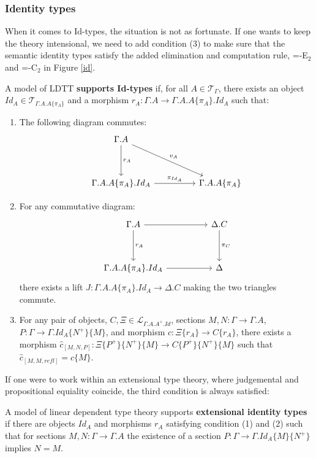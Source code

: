 \subsubsection{Identity types}
When it comes to Id-types, the situation is not as fortunate. If one wants to keep the theory intensional, we need to add condition (3) to make sure that the semantic identity types satisfy the added elimination and computation rule, =-E$_2$ and =-C$_2$ in Figure \ref{id}.

\begin{defn}[Id-types]\label{idsemantic}
  A model of LDTT \textbf{supports Id-types} if, for all $A \in \mathcal{T}_{\Gamma}$, there exists an object $Id_A \in \mathcal{T}_{\Gamma.A.A\{\pi_A\}}$ and a morphism $r_A : \Gamma.A \to \Gamma.A.A\{\pi_A\}.Id_{A}$ such that:
  \begin{enumerate}
    \item The following diagram commutes:
  \[
    \ti
    \Gamma.A \ar[d, "r_A"] \ar[rd, "v_A"]\\
    \Gamma.A.A\{\pi_A\}.Id_A \ar[r, "\pi_{Id_A}"] & \Gamma.A.A\{\pi_A\}
    \kz
  \]
\item For any commutative diagram:
  \[
    \ti
    \Gamma.A \ar[d, "r_A"] \ar[r] & \Delta.C \ar[d, "\pi_C"]\\
    \Gamma.A.A\{\pi_A\}.Id_A \ar[r] & \Delta
    \kz
  \]
  there exists a lift $J: \Gamma.A.A\{\pi_A\}.Id_A \to \Delta.C$ making the two triangles commute.
\item For any pair of objects, $C, \Xi \in \mathcal{L}_{\Gamma.A.A^+.Id}$, sections $M, N : \Gamma \to \Gamma.A$, $P : \Gamma \to \Gamma.Id_A\{N^+\}\{M\}$, and morphism $c : \Xi\{r_A\} \to C\{r_A\}$, there exists a morphism $\hat c_{[M,N,P]} : \Xi\{P^+\}\{N^+\}\{M\} \to C\{P^+\}\{N^+\}\{M\}$ such that $\hat c_{[M,M,refl]} = c\{M\}$.
\end{enumerate}
\end{defn}
If one were to work within an extensional type theory, where judgemental and propositional equiality coincide, the third condition is always satisfied:
\begin{defn}A model of linear dependent type theory supports \textbf{extensional identity types} if there are objects $Id_A$ and morphisms $r_A$ satisfying condition (1) and (2) such that for sections $M,N : \Gamma \to \Gamma.A$ the existence of a section $P : \Gamma \to \Gamma.Id_A\{M\}\{N^+\}$ implies $N = M$.
\end{defn}
